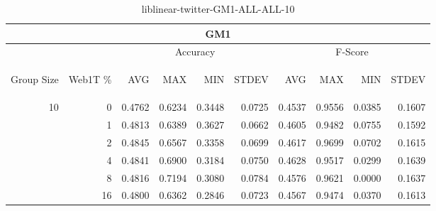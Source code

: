 \begin{center}
\begin{table}[htbp] 
 \begin{center}
\begin{tabular}{ | r | r | r | r | r | r | r | r | r | r |}
\hline
\multicolumn{10}{|c|}{GM1}\\
\hline
 & & \multicolumn{4}{|c|}{Accuracy} & \multicolumn{4}{|c|}{F-Score}\\ \cline{3-10}
\begin{sideways}Group Size\end{sideways} & \begin{sideways}Web1T \%\end{sideways} & \begin{sideways}AVG\end{sideways} & \begin{sideways}MAX\end{sideways} & \begin{sideways}MIN\end{sideways} & \begin{sideways}STDEV\end{sideways} & \begin{sideways}AVG\end{sideways} & \begin{sideways}MAX\end{sideways} & \begin{sideways}MIN\end{sideways} & \begin{sideways}STDEV\end{sideways}\\
\hline
\multirow{5}{*}{10}
 & 0 & 0.4762 & 0.6234 & 0.3448 & 0.0725 & 0.4537 & 0.9556 & 0.0385 & 0.1607\\ \cline{2-10}
 & 1 & 0.4813 & 0.6389 & 0.3627 & 0.0662 & 0.4605 & 0.9482 & 0.0755 & 0.1592\\ \cline{2-10}
 & 2 & 0.4845 & 0.6567 & 0.3358 & 0.0699 & 0.4617 & 0.9699 & 0.0702 & 0.1615\\ \cline{2-10}
 & 4 & 0.4841 & 0.6900 & 0.3184 & 0.0750 & 0.4628 & 0.9517 & 0.0299 & 0.1639\\ \cline{2-10}
 & 8 & 0.4816 & 0.7194 & 0.3080 & 0.0784 & 0.4576 & 0.9621 & 0.0000 & 0.1637\\ \cline{2-10}
 & 16 & 0.4800 & 0.6362 & 0.2846 & 0.0723 & 0.4567 & 0.9474 & 0.0370 & 0.1613\\ \cline{2-10}
\hline
\end{tabular}
\caption{liblinear-twitter-GM1-ALL-ALL-10}
\label{table:liblinear-twitter-GM1-ALL-ALL-10}
\end{center}
 \end{table}
\end{center}


